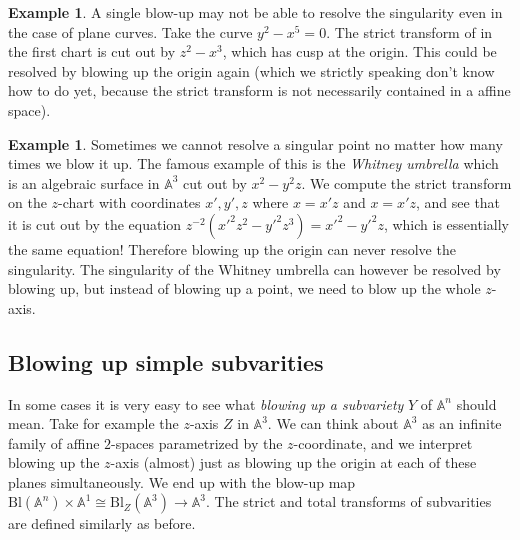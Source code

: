 \documentclass[12pt,a4paper,leqno]{article}
\newcommand{\Aff}{\mathbb{A}}
\newcommand{\bl}{\mathrm{Bl}}
\theoremstyle{plain}
\theoremstyle{definition}
\newtheorem{ex}[theo]{Example}
\theoremstyle{remark}
\begin{document}
\begin{ex}
A single blow-up may not be able to resolve the singularity even in the case of plane curves. Take the curve $y^2 - x^5 = 0$. The strict transform of in the first chart is cut out by $z^2 - x^3$, which has cusp at the origin. This could be resolved by blowing up the origin again (which we strictly speaking don't know how to do yet, because the strict transform is not necessarily contained in a affine space). 
\end{ex}

\begin{ex}
Sometimes we cannot resolve a singular point no matter how many times we blow it up. The famous example of this is the \emph{Whitney umbrella} which is an algebraic surface in $\Aff^3$ cut out by $x^2 - y^2 z$. We compute the strict transform on the $z$-chart with coordinates $x',y',z$ where $x=x'z$ and $x=x'z$, and see that it is cut out by the equation $z^{-2} (x'^2 z^2 - y'^2z^3) = x'^2 - y'^2z$, which is essentially the same equation! Therefore blowing up the origin can never resolve the singularity. The singularity of the Whitney umbrella can however be resolved by blowing up, but instead of blowing up a point, we need to blow up the whole $z$-axis.
\end{ex}

\subsection{Blowing up simple subvarities}

In some cases it is very easy to see what \emph{blowing up a subvariety} $Y$ of $\Aff^n$ should mean. Take for example the $z$-axis $Z$ in $\Aff^3$. We can think about $\Aff^3$ as an infinite family of affine $2$-spaces parametrized by the $z$-coordinate, and we interpret blowing up the $z$-axis (almost) just as blowing up the origin at each of these planes simultaneously. We end up with the blow-up map $\bl (\Aff^n) \times \Aff^1 \cong \bl_Z(\Aff^3) \to \Aff^3$. The strict and total transforms of subvarities are defined similarly as before.
\end{document}
